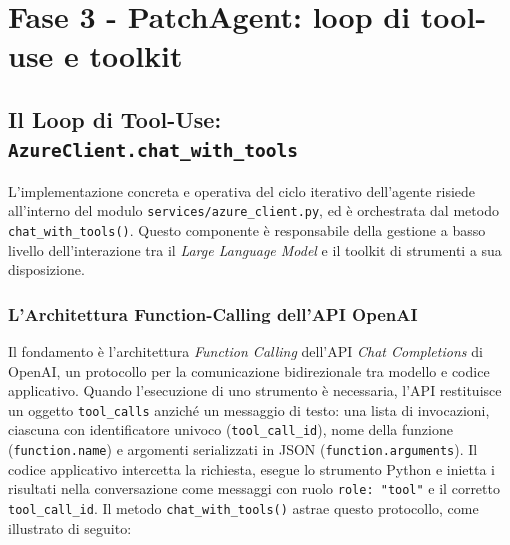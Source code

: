 \section{Fase 3 - PatchAgent: loop di tool-use e toolkit}
\label{sec:fase3-toolkit}

\subsection{Il Loop di Tool-Use: \texttt{AzureClient.chat\_with\_tools}}
\label{subsec:3.4.3}
L'implementazione concreta e operativa del ciclo iterativo dell'agente
risiede all'interno del modulo \texttt{services/azure\_client.py}, ed è orchestrata
dal metodo \texttt{chat\_with\_tools()}. Questo componente è responsabile della gestione
a basso livello dell'interazione tra il \textit{Large Language Model}
e il toolkit di strumenti a sua disposizione.

\subsubsection{L'Architettura Function-Calling dell'API OpenAI}
\label{subsubsec:3.4.3.1}
Il fondamento è l'architettura \textit{Function Calling} dell'API \textit{Chat Completions} di OpenAI, un
protocollo per la comunicazione bidirezionale tra modello e codice applicativo. Quando l'esecuzione di uno
strumento è necessaria, l'API restituisce un oggetto \texttt{tool\_calls} anziché un messaggio di testo: una lista
di invocazioni, ciascuna con identificatore univoco (\texttt{tool\_call\_id}), nome della funzione
(\texttt{function.name}) e argomenti serializzati in JSON (\texttt{function.arguments}). Il codice applicativo
intercetta la richiesta, esegue lo strumento Python e inietta i risultati nella conversazione come messaggi con
ruolo \texttt{role: "tool"} e il corretto \texttt{tool\_call\_id}. Il metodo \texttt{chat\_with\_tools()} astrae
questo protocollo, come illustrato di seguito:

